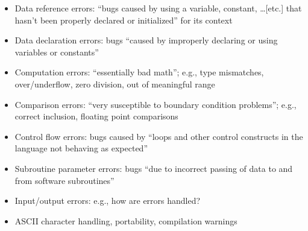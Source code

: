 \begin{itemize}
      \item Data reference errors: ``bugs caused by using a variable, constant,
            \dots [etc.] that hasn't been properly declared or initialized''
            for its context \cite[p.~99]{patton_software_2006}
      \item Data declaration errors: bugs ``caused by improperly declaring
            or using variables or constants'' \cite[p.~100]{patton_software_2006}
      \item Computation errors: ``essentially bad math''; e.g., type mismatches,
            over/underflow, zero division, out of meaningful range
            \cite[p.~101]{patton_software_2006}
            \label{comp-errors}
      \item Comparison errors: ``very susceptible to boundary condition
            problems''; e.g., correct inclusion, floating point comparisons
            \cite[p.~101]{patton_software_2006}
      \item Control flow errors: bugs caused by ``loops and other control
            constructs in the language not behaving as expected''
            \cite[p.~102]{patton_software_2006}
      \item Subroutine parameter errors: bugs ``due to incorrect passing of data
            to and from software subroutines'' \cite[p.~102]{patton_software_2006}
      \item Input/output errors: e.g., how are errors handled?
            \cite[p.~102-103]{patton_software_2006}
      \item ASCII character handling, portability, compilation warnings
            \cite[p.~103]{patton_software_2006}
\end{itemize}


